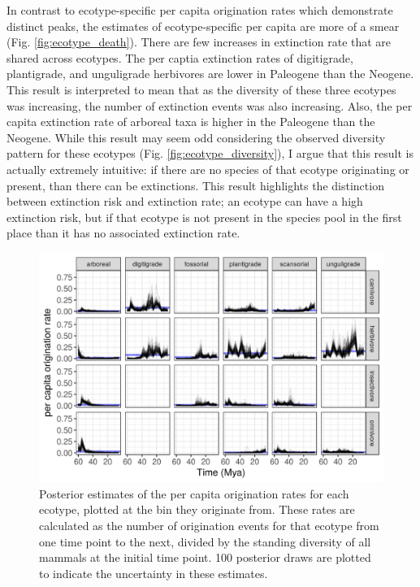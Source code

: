 \documentclass[12pt,letterpaper]{article}
\begin{document}
In contrast to ecotype-specific per capita origination rates which demonstrate distinct peaks, the estimates of ecotype-specific per capita are more of a smear (Fig. \ref{fig:ecotype_death}). There are few increases in extinction rate that are shared across ecotypes. The per captia extinction rates of digitigrade, plantigrade, and unguligrade herbivores are lower in Paleogene than the Neogene. This result is interpreted to mean that as the diversity of these three ecotypes was increasing, the number of extinction events was also increasing. Also, the per capita extinction rate of arboreal taxa is higher in the Paleogene than the Neogene. While this result may seem odd considering the observed diversity pattern for these ecotypes (Fig. \ref{fig:ecotype_diversity}), I argue that this result is actually extremely intuitive: if there are no species of that ecotype originating or present, than there can be extinctions. This result highlights the distinction between extinction risk and extinction rate; an ecotype can have a high extinction risk, but if that ecotype is not present in the species pool in the first place than it has no associated extinction rate. 

\begin{figure}[ht]
  \centering
  \includegraphics[width=\textwidth,height=0.4\textheight,keepaspectratio=true]{figure/birth_eco}
  \caption[Estimated per capita origination rates by mammal ecotype]{Posterior estimates of the per capita origination rates for each ecotype, plotted at the bin they originate from. These rates are calculated as the number of origination events for that ecotype from one time point to the next, divided by the standing diversity of all mammals at the initial time point. 100 posterior draws are plotted to indicate the uncertainty in these estimates.}
  \label{fig:ecotype_birth}
\end{figure}
\end{document}
